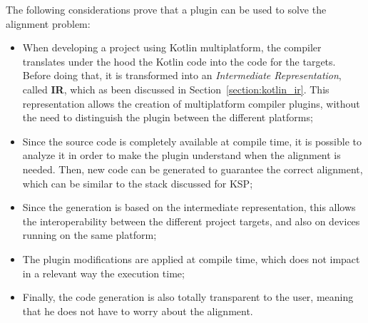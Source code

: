 The following considerations prove that a plugin can be used to solve the alignment problem:
\begin{itemize}
    \item When developing a project using Kotlin multiplatform, the compiler translates under the hood the Kotlin code into the code for the targets. Before doing that, it is transformed into an \textit{Intermediate Representation}, called \textbf{IR}, which as been discussed in Section~\ref{section:kotlin_ir}. This representation allows the creation of multiplatform compiler plugins, without the need to distinguish the plugin between the different platforms;
    \item Since the source code is completely available at compile time, it is possible to analyze it in order to make the plugin understand when the alignment is needed. Then, new code can be generated to guarantee the correct alignment, which can be similar to the stack discussed for KSP; 
    \item Since the generation is based on the intermediate representation, this allows the interoperability between the different project targets, and also on devices running on the same platform;
    \item The plugin modifications are applied at compile time, which does not impact in a relevant way the execution time;
    \item Finally, the code generation is also totally transparent to the user, meaning that he does not have to worry about the alignment.
\end{itemize}

